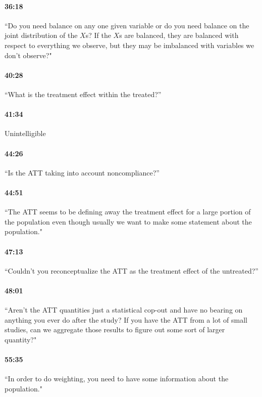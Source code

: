 \documentclass[11pt]{article}
\begin{document}
\paragraph{36:18} ``Do you need balance on any one given variable or do you need balance on the joint distribution of the $X$s?  If the $X$s are balanced, they are balanced with respect to everything we observe, but they may be imbalanced with variables we don't observe?"

\paragraph{40:28} ``What is the treatment effect within the treated?''

\paragraph{41:34} Unintelligible

\paragraph{44:26} ``Is the ATT taking into account noncompliance?''

\paragraph{44:51} ``The ATT seems to be defining away the treatment effect for a large portion of the population even though usually we want to make some statement about the population."

\paragraph{47:13} ``Couldn't you reconceptualize the ATT as the treatment effect of the untreated?''

\paragraph{48:01} ``Aren't the ATT quantities just a statistical cop-out and have no bearing on anything you ever do after the study?  If you have the ATT from a lot of small studies, can we aggregate those results to figure out some sort of larger quantity?"

\paragraph{55:35} ``In order to do weighting, you need to have some information about the population."
\end{document}
